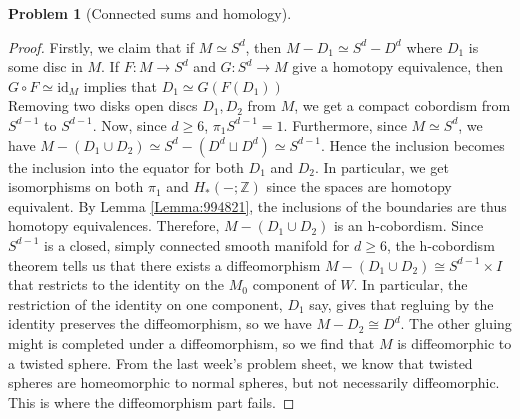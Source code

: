 \documentclass[reqno]{amsart}
\theoremstyle{definition}
\newtheorem{problem}[theorem]{Problem}
\theoremstyle{remark}
\newcommand{\id}{{\mathrm{id}}}
\begin{document}
\begin{problem}[Connected sums and homology]
       \begin{proof}
           Firstly, we claim that if
           $M \simeq S^{d}$, then
           $M - D_1 \simeq S^{d} - D^{d}$ where
           $D_1$ is some disc in $M$.
           If $F \colon M \to S^{d}$
           and $G \colon S^{d}\to M$ give a homotopy equivalence,
           then $G \circ F \simeq \id_M$ implies that
           $D_1 \simeq G \left( F(D_1) \right) $ \\

           Removing two disks open discs
           $D_1,D_2$ from $M$, we get a compact
           cobordism from $S^{d-1}$ to
           $S^{d-1}$. Now, since $d \ge 6$,
           $\pi_1 S^{d-1} = 1$. Furthermore,
           since $M \simeq S^{d}$, we have
           $M - \left( D_1 \cup D_2 \right)  \simeq
           S^{d} - \left( D^{d} \sqcup D^{d} \right) 
           \simeq S^{d-1}$. Hence the
           inclusion becomes the inclusion into the equator
           for both  $D_1$ and $D_2$. In particular,
           we get isomorphisms on both $\pi_1$ and 
           $H_* (-;\mathbb{Z})$ since the spaces
           are homotopy equivalent.
           By Lemma \ref{Lemma:994821},
           the inclusions of the boundaries are
           thus homotopy equivalences. Therefore,
           $M - \left( D_1 \cup D_2 \right) $ is
           an h-cobordism. Since
           $S^{d-1}$ is a closed, simply connected smooth
           manifold for $d\ge 6$, the
           h-cobordism theorem tells us that there
           exists a diffeomorphism
           $M - \left( D_1 \cup  D_2 \right) 
           \cong S^{d-1} \times I$ that restricts to the
           identity on the $M_0$ component of $W$. In particular,
           the restriction of the identity on
           one component, $D_1$ say, gives that regluing by
           the identity preserves the diffeomorphism, so
           we have
           $M - D_2 \cong D^{d}$.
           The other gluing might is completed under a
           diffeomorphism, so we find that
           $M$ is diffeomorphic to a twisted sphere.
           From the last week's problem sheet, we
           know that twisted spheres are homeomorphic to
           normal spheres, but not necessarily diffeomorphic.
           This is where the diffeomorphism part fails.
       \end{proof}









\end{problem}
\end{document}
